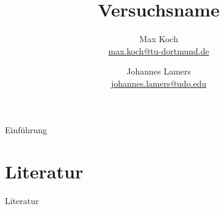 \documentclass[aspectratio=1610, 9pt]{beamer}
\title{Versuchsname}
\author[M.~Koch \and J.~Lamers]{
 Max Koch\\%
 \href{mailto:max.koch@tu-dortmund.de}{max.koch@tu-dortmund.de}%
 \and%
 Johannes Lamers\\%
\href{mailto:johannes.lamers@edu.edu}{johannes.lamers@udo.edu}%
 }
\institute[Kurzform Lehrstuhl]{Names des Lehrstuhls}
\begin{document}
\maketitle

\begin{frame}{Einführung}
  \tableofcontents
\end{frame}








\section{Literatur}
\begin{frame}{Literatur}
\printbibliography{}
\end{frame}
\end{document}
